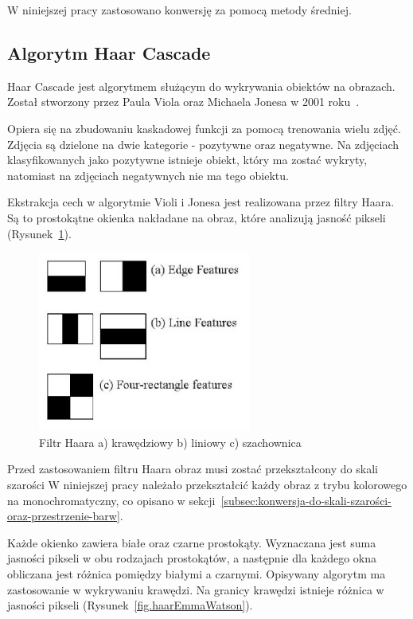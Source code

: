 \documentclass[a4paper,twoside,12pt]{book}
\begin{document}
    W niniejszej pracy zastosowano konwersję za pomocą metody średniej.
    \subsection{Algorytm Haar Cascade}\label{subsec:algorytm-haar-cascade}

    Haar Cascade jest algorytmem służącym do wykrywania obiektów na obrazach.
    Został stworzony przez Paula Viola oraz Michaela Jonesa w 2001 roku~\cite{violaJones}.

    Opiera się na zbudowaniu kaskadowej funkcji za pomocą trenowania wielu zdjęć.
    Zdjęcia są dzielone na
    dwie kategorie - pozytywne oraz negatywne.
    Na zdjęciach klasyfikowanych jako pozytywne istnieje obiekt, który ma zostać wykryty, natomiast
    na zdjęciach negatywnych nie ma tego obiektu.

    Ekstrakcja cech w algorytmie Violi i Jonesa jest realizowana przez filtry Haara.
    Są to prostokątne okienka
    nakładane na obraz, które analizują jasność pikseli (Rysunek~\ref{fig.haarRectangles}).
    \begin{figure}
        \centering
        \includegraphics[width=7cm]{Obrazy/Haar_filter_rectangles.jpg}
        \caption{Filtr Haara a) krawędziowy b) liniowy c) szachownica~\cite{haar}}
        \label{fig.haarRectangles}
    \end{figure}

    Przed zastosowaniem filtru Haara obraz musi zostać przekształcony do skali szarości
    W niniejszej pracy należało przekształcić każdy obraz z trybu kolorowego na monochromatyczny, co opisano w sekcji~\ref{subsec:konwersja-do-skali-szarości-oraz-przestrzenie-barw}.

    Każde okienko zawiera białe oraz czarne prostokąty.
    Wyznaczana jest suma jasności pikseli w obu rodzajach prostokątów, a
    następnie dla każdego okna obliczana jest różnica pomiędzy białymi a czarnymi.
    Opisywany algorytm ma zastosowanie w wykrywaniu krawędzi.
    Na granicy krawędzi istnieje różnica w jasności pikseli
    (Rysunek~\ref{fig.haarEmmaWatson}).
\end{document}
